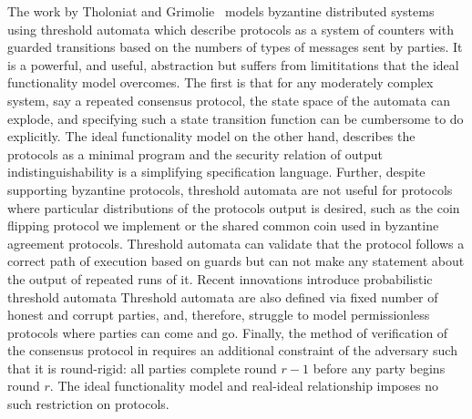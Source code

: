 The work by Tholoniat and Grimolie~\cite{tholoniat2022formal} models byzantine
distributed systems using threshold automata which describe protocols as a
system of counters with guarded transitions based on the numbers of types of
messages sent by parties.  It is a powerful, and useful, abstraction but
suffers from limititations that the ideal functionality model overcomes.  The
first is that for any moderately complex system, say a repeated consensus
protocol, the state space of the automata can explode, and specifying such a
state transition function can be cumbersome to do explicitly.  The ideal
functionality model on the other hand, describes the protocols as a minimal
program and the security relation of output indistinguishability is a
simplifying specification language.  Further, despite supporting byzantine
protocols, threshold automata are not useful for protocols where particular
distributions of the protocols output is desired, such as the coin flipping
protocol we implement or the shared common coin used in byzantine agreement
protocols.  Threshold automata can validate that the protocol follows a correct
path of execution based on guards but can not make any statement about the
output of repeated runs of it.  Recent innovations introduce probabilistic
threshold automata Threshold automata are also defined via fixed number of
honest and corrupt parties, and, therefore, struggle to model permissionless
protocols where parties can come and go.  Finally, the method of verification
of the consensus protocol in \cite{tholoniate2022formal} requires an additional
constraint of the adversary such that it is round-rigid: all parties complete
round $r-1$ before any party begins round $r$. 
The ideal functionality model and real-ideal relationship imposes no such
restriction on protocols.



